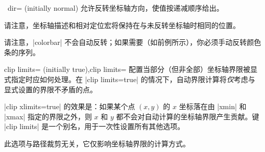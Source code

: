 \begin{pgfplotsxykey}{\x\ dir= (initially normal)}
\label{key:pgfplots:xydir}%
    允许反转坐标轴方向，使值按递减顺序给出。
\begin{codeexample}[]
\end{codeexample}

\begin{codeexample}[]
\end{codeexample}

    请注意，坐标轴描述和相对定位宏将保持在与未反转坐标轴时相同的位置。
\begin{codeexample}[]
\end{codeexample}

    请注意，|colorbar| 不会自动反转；如果需要（如前例所示），你必须手动反转颜色条的序列。
\end{pgfplotsxykey}

\begin{pgfplotsxykeylist}{clip \x limits= (initially true),clip limits=}
    配置当部分（但非全部）坐标轴界限被显式指定时应如何处理。在 |clip limits=true| 的情况下，自动界限计算将\emph{仅}考虑与显式设置的界限不矛盾的点。

    |clip xlimits=true| 的效果是：如果某个点 $(x,y)$ 的 $x$ 坐标落在由 |xmin| 和 |xmax| 指定的界限之外，则 $x$ 和 $y$ 都不会对自动计算的坐标轴界限产生贡献。键 |clip limits| 是一个别名，用于一次性设置所有其他选项。

    此选项与路径裁剪无关，它仅影响坐标轴界限的计算方式。
\end{pgfplotsxykeylist}

